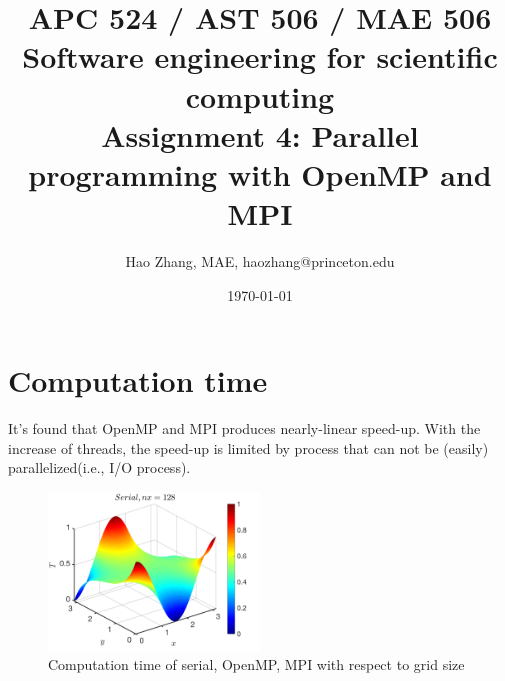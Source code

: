 \documentclass[a4paper]{article}
\title{APC 524 / AST 506 / MAE 506 Software engineering for scientific computing
\\Assignment 4: Parallel programming with OpenMP and MPI}
\author{Hao Zhang, MAE, haozhang@princeton.edu}
\date{\today}
\begin{document}
\maketitle

    \section{Computation time}
    It's found that OpenMP and MPI produces nearly-linear speed-up. With the increase of threads, the speed-up is limited by process that can not be (easily) parallelized(i.e., I/O process).
      \begin{figure}[H]
            \centering 
            \includegraphics[width=0.5\textwidth]{./Figure/computation_time.png} 
        \caption{Computation time of serial, OpenMP, MPI with respect to grid size}
    \end{figure}
    
\end{document}
